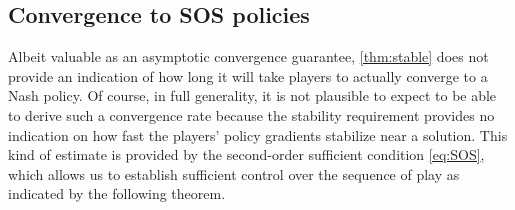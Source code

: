 \subsection{Convergence to \acl{SOS} policies}

Albeit valuable as an asymptotic convergence guarantee, \cref{thm:stable} does not provide an indication of how long it will take players to actually converge to a Nash policy.
Of course, in full generality, it is not plausible to expect to be able to derive such a convergence rate because the stability requirement provides no indication on how fast the players' policy gradients stabilize near a solution.
This kind of estimate is provided by the second-order sufficient condition \eqref{eq:SOS}, which allows us to establish sufficient control over the sequence of play as indicated by the following theorem.


